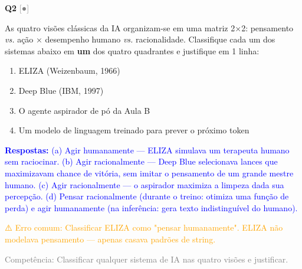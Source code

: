 \documentclass[12pt,a4paper]{article}
\newcommand{\sol}[1]{\textcolor{blue}{#1}}
\newcommand{\errocomum}[1]{\textcolor{orange}{⚠️ Erro comum: #1}}
\newcommand{\competencia}[1]{\textcolor{gray}{Competência: #1}}
\newcommand{\sol}[1]{}
\newcommand{\errocomum}[1]{}
\newcommand{\competencia}[1]{}
\newcommand{\sol}[1]{}
\newcommand{\errocomum}[1]{}
\newcommand{\competencia}[1]{}
\newcommand{\nivel}[1]{\textcolor{gray}{[#1]}}
\newenvironment{questao}[2]{
  \vspace{0.5cm}
  \noindent\textbf{Q#1} \nivel{#2} \quad
}{
  \vspace{0.2cm}
}
\begin{document}
\begin{questao}{2}{●}
  As quatro visões clássicas da IA organizam-se em uma matriz 2×2:
  pensamento \textit{vs.} ação × desempenho humano \textit{vs.} racionalidade.
  Classifique cada um dos sistemas abaixo em \textbf{um} dos quatro quadrantes
  e justifique em 1 linha:

  \begin{enumerate}[label=(\alph*),nosep]
    \item ELIZA (Weizenbaum, 1966)
    \item Deep Blue (IBM, 1997)
    \item O agente aspirador de pó da Aula B
    \item Um modelo de linguagem treinado para prever o próximo token
  \end{enumerate}

  \sol{
    \textbf{Respostas:}
    (a) Agir humanamente — ELIZA simulava um terapeuta humano sem raciocinar.
    (b) Agir racionalmente — Deep Blue selecionava lances que maximizavam chance de vitória,
    sem imitar o pensamento de um grande mestre humano.
    (c) Agir racionalmente — o aspirador maximiza a limpeza dada sua percepção.
    (d) Pensar racionalmente (durante o treino: otimiza uma função de perda) e
    agir humanamente (na inferência: gera texto indistinguível do humano).

    \errocomum{Classificar ELIZA como "pensar humanamente". ELIZA não modelava pensamento —
    apenas casava padrões de string.}

    \competencia{Classificar qualquer sistema de IA nas quatro visões e justificar.}
  }
\end{questao}
\end{document}
